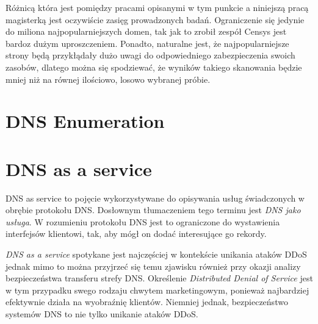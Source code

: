Różnicą która jest pomiędzy pracami opisanymi w tym punkcie a niniejszą pracą magisterką jest oczywiście zasięg prowadzonych badań. Ograniczenie się jedynie do miliona najpopularniejszych domen, tak jak to zrobił zespół Censys\cite{censys} jest bardoz dużym uproszczeniem. Ponadto, naturalne jest, że najpopularniejsze strony będą przykłądały dużo uwagi do odpowiedniego zabezpieczenia swoich zasobów, dlatego można się spodziewać, że wyników takiego skanowania będzie mniej niż na równej ilościowo, losowo wybranej próbie. 

\section{DNS Enumeration}

\section{DNS as a service}
DNS as service to pojęcie wykorzystywane do opisywania usług świadczonych w obrębie protokołu DNS. Dosłownym tłumaczeniem tego terminu jest \textit{DNS jako usługa}. W rozumieniu protokołu DNS jest to ograniczone do wystawienia interfejsów klientowi, tak, aby mógł on dodać interesujące go rekordy. 

\textit{DNS as a service} spotykane jest najczęściej w kontekście unikania ataków DDoS jednak mimo to można przyjrzeć się temu zjawisku również przy okazji analizy bezpieczeństwa transferu strefy DNS. Określenie \textit{Distributed Denial of Service} jest w tym przypadku swego rodzaju chwytem marketingowym, ponieważ najbardziej efektywnie działa na wyobraźnię klientów. Niemniej jednak, bezpieczeństwo systemów DNS to nie tylko unikanie ataków DDoS. 

